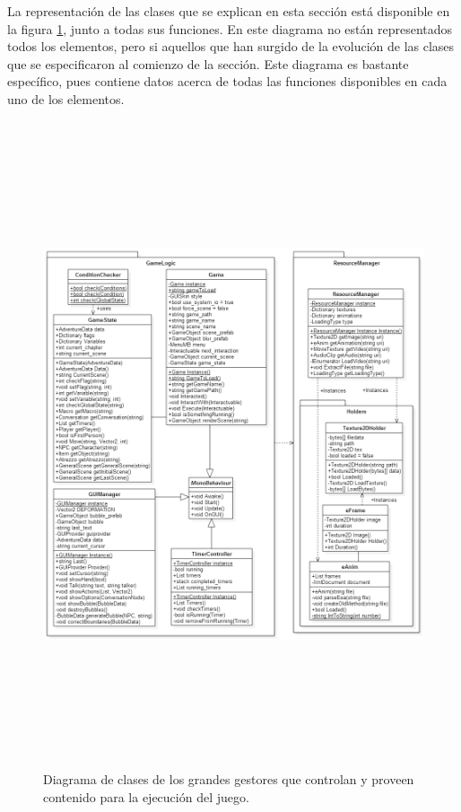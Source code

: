 La representación de las clases que se explican en esta sección está disponible en la figura \ref{runnerbigit2}, junto a todas sus funciones. En este diagrama no están representados todos los elementos, pero si aquellos que han surgido de la evolución de las clases que se especificaron al comienzo de la sección. Este diagrama es bastante específico, pues contiene datos acerca de todas las funciones disponibles en cada uno de los elementos.

\newpage

\begin{figure}[h!]
	\centerline{\includegraphics[height=7.5in]{figures/it2/GameLogicBigOnes.png}}
	\caption[GameLogic Grandes Gestores - Versión Final]{Diagrama de clases de los grandes gestores que controlan y proveen contenido para la ejecución del juego.}
	\label{runnerbigit2}
\end{figure}

